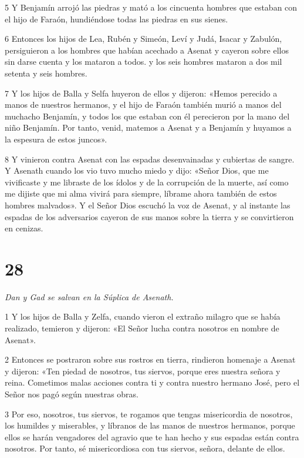 \par 5 Y Benjamín arrojó las piedras y mató a los cincuenta hombres que estaban con el hijo de Faraón, hundiéndose todas las piedras en sus sienes.

\par 6 Entonces los hijos de Lea, Rubén y Simeón, Leví y Judá, Isacar y Zabulón, persiguieron a los hombres que habían acechado a Asenat y cayeron sobre ellos sin darse cuenta y los mataron a todos. y los seis hombres mataron a dos mil setenta y seis hombres.

\par 7 Y los hijos de Balla y Selfa huyeron de ellos y dijeron: «Hemos perecido a manos de nuestros hermanos, y el hijo de Faraón también murió a manos del muchacho Benjamín, y todos los que estaban con él perecieron por la mano del niño Benjamín. Por tanto, venid, matemos a Asenat y a Benjamín y huyamos a la espesura de estos juncos».

\par 8 Y vinieron contra Asenat con las espadas desenvainadas y cubiertas de sangre. Y Asenath cuando los vio tuvo mucho miedo y dijo: «Señor Dios, que me vivificaste y me libraste de los ídolos y de la corrupción de la muerte, así como me dijiste que mi alma vivirá para siempre, líbrame ahora también de estos hombres malvados». Y el Señor Dios escuchó la voz de Asenat, y al instante las espadas de los adversarios cayeron de sus manos sobre la tierra y se convirtieron en cenizas.

\chapter{28}

\par \textit{Dan y Gad se salvan en la Súplica de Asenath.}


\par 1 Y los hijos de Balla y Zelfa, cuando vieron el extraño milagro que se había realizado, temieron y dijeron: «El Señor lucha contra nosotros en nombre de Asenat».

\par 2 Entonces se postraron sobre sus rostros en tierra, rindieron homenaje a Asenat y dijeron: «Ten piedad de nosotros, tus siervos, porque eres nuestra señora y reina. Cometimos malas acciones contra ti y contra nuestro hermano José, pero el Señor nos pagó según nuestras obras.

\par 3 Por eso, nosotros, tus siervos, te rogamos que tengas misericordia de nosotros, los humildes y miserables, y líbranos de las manos de nuestros hermanos, porque ellos se harán vengadores del agravio que te han hecho y sus espadas están contra nosotros. Por tanto, sé misericordiosa con tus siervos, señora, delante de ellos.

